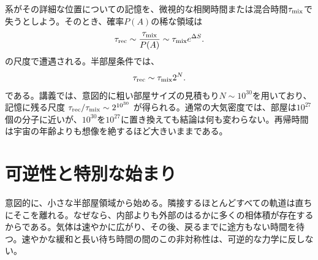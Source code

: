 系がその詳細な位置についての記憶を、微視的な相関時間または混合時間\(\tau_{\rm mix}\)で失うとしよう。そのとき、確率\(P(A)\)の稀な領域は
\begin{equation}
 \tau_{\rm rec}
 \sim \frac{\tau_{\rm mix}}{P(A)}
 \sim \tau_{\rm mix}e^{\Delta S}.
 \label{eq:sm8-recurrence-time-general}
\end{equation}
の尺度で遭遇される。半部屋条件では、
\begin{equation}
 \tau_{\rm rec}\sim\tau_{\rm mix}2^N.
 \label{eq:sm8-recurrence-time-half}
\end{equation}
である。講義では、意図的に粗い部屋サイズの見積もり\(N\sim10^{30}\)を用いており、記憶に残る尺度
\(\tau_{\rm rec}/\tau_{\rm mix}\sim2^{10^{30}}\)
が得られる。通常の大気密度では、部屋は\(10^{27}\)個の分子に近いが、\(10^{30}\)を\(10^{27}\)に置き換えても結論は何も変わらない。再帰時間は宇宙の年齢よりも想像を絶するほど大きいままである。

\begin{classroomqa}
\end{classroomqa}

\begin{classroomqa}
\end{classroomqa}

\section{可逆性と特別な始まり}

意図的に、小さな半部屋領域から始める。隣接するほとんどすべての軌道は直ちにそこを離れる。なぜなら、内部よりも外部のはるかに多くの相体積が存在するからである。気体は速やかに広がり、その後、戻るまでに途方もない時間を待つ。速やかな緩和と長い待ち時間の間のこの非対称性は、可逆的な力学に反しない。

